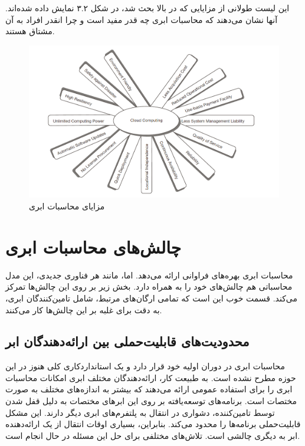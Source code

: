 \documentclass{book}
\begin{document}
        این لیست طولانی از مزایایی که در بالا بحث شد، در شکل ۳.۲ نمایش داده شده‌اند. آنها نشان می‌دهند که محاسبات ابری چه قدر مفید است و چرا انقدر افراد به آن مشتاق هستند.

    \begin{figure}[htbp]

        \centering
        \includegraphics[width=1\textwidth]{image/fig 3.2.png}
        \caption{مزایای محاسبات ابری}
        \label{fig:fig_3.2}

    \end{figure}

    \section{چالش‌های محاسبات ابری}

        محاسبات ابری بهره‌های فراوانی ارائه می‌دهد. اما، مانند هر فناوری جدیدی، این مدل محاسباتی هم چالش‌های خود را به همراه دارد. بخش زیر بر روی این چالش‌ها تمرکز می‌کند. قسمت خوب این است که تمامی ارگان‌های مرتبط، شامل تامین‌کنندگان ابری، به دقت برای غلبه بر این چالش‌ها کار می‌کنند.
    
    \subsection{محدودیت‌های قابلیت‌حملی بین ارائه‌دهندگان ابر}

        محاسبات ابری در دوران اولیه خود قرار دارد و یک استانداردکاری کلی هنوز در این حوزه مطرح نشده است. به طبیعت کار، ارائه‌دهندگان مختلف ابری امکانات محاسبات ابری را برای استفاده عمومی ارائه می‌دهند که بیشتر به اندازه‌های مختلف به صورت مختصات است. برنامه‌های توسعه‌یافته بر روی این ابرهای مختصات به دلیل قفل شدن توسط تامین‌کننده، دشواری در انتقال به پلتفرم‌های ابری دیگر دارند. این مشکل قابلیت‌حملی برنامه‌ها را محدود می‌کند. بنابراین، بسیاری اوقات انتقال از یک ارائه‌دهنده ابر به دیگری چالشی است. تلاش‌های مختلفی برای حل این مسئله در حال انجام است.
\end{document}
